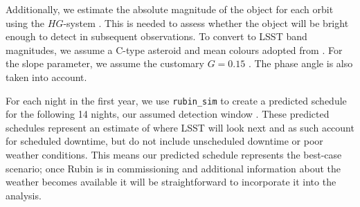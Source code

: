 \documentclass[twocolumn]{aastex631}
\begin{document}

Additionally, we estimate the absolute magnitude of the object for each orbit using the $HG$-system \citep{mpc_h_g}. This is needed to assess whether the object will be bright enough to detect in subsequent observations. To convert to LSST band magnitudes, we assume a C-type asteroid and mean colours adopted from \citep{Jones+2018}. For the slope parameter, we assume the customary $G=0.15$ \citep{mpc_h_g}. The phase angle is also taken into account.


For each night in the first year, we use \texttt{rubin\_sim} to create a predicted schedule for the following 14 nights, our assumed detection window \citep{rubin_sim}. These predicted schedules represent an estimate of where LSST will look next and as such account for scheduled downtime, but do not include unscheduled downtime or poor weather conditions. This means our predicted schedule represents the best-case scenario; once Rubin is in commissioning and additional information about the weather becomes available it will be straightforward to incorporate it into the analysis.
\end{document}
